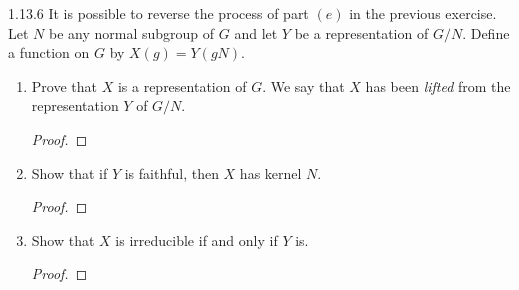 \documentclass{../../math174}
\date{Wednesday, February 27}
\author{}
\begin{document}
\begin{problemlist}
\item[1.13.6] It is possible to reverse the process of part \((e)\) in
  the previous exercise.  Let \(N\) be any normal subgroup of \(G\)
  and let \(Y\) be a representation of \(G/N\).  Define a function on
  \(G\) by \(X(g) = Y(gN)\).
  \begin{enumerate}
  \item Prove that \(X\) is a representation of \(G\).  We say that
    \(X\) has been \textit{lifted} from the representation \(Y\) of
    \(G/N\).

    \begin{solution}
      \begin{proof}

      \end{proof}
    \end{solution}

  \item Show that if \(Y\) is faithful, then \(X\) has kernel \(N\).

    \begin{solution}
      \begin{proof}

      \end{proof}
    \end{solution}

  \item Show that \(X\) is irreducible if and only if \(Y\) is.

    \begin{solution}
      \begin{proof}

      \end{proof}
    \end{solution}
  \end{enumerate}
\end{problemlist}
\end{document}
